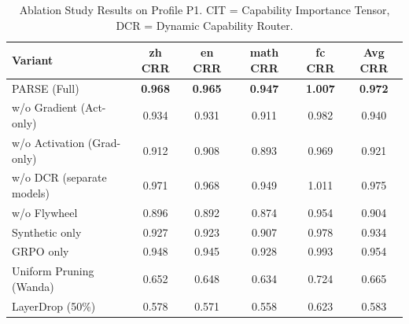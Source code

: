 \begin{table}[t]
\centering
\caption{Ablation Study Results on Profile P1. CIT = Capability Importance Tensor, DCR = Dynamic Capability Router.}
\label{tab:ablation}
\begin{tabular}{l|cccc|c}
\toprule
Variant & zh CRR & en CRR & math CRR & fc CRR & Avg CRR \\
\midrule
PARSE (Full) & \textbf{0.968} & \textbf{0.965} & \textbf{0.947} & \textbf{1.007} & \textbf{0.972} \\
w/o Gradient (Act-only) & 0.934 & 0.931 & 0.911 & 0.982 & 0.940 \\
w/o Activation (Grad-only) & 0.912 & 0.908 & 0.893 & 0.969 & 0.921 \\
w/o DCR (separate models) & 0.971 & 0.968 & 0.949 & 1.011 & 0.975 \\
w/o Flywheel & 0.896 & 0.892 & 0.874 & 0.954 & 0.904 \\
  Synthetic only & 0.927 & 0.923 & 0.907 & 0.978 & 0.934 \\
  GRPO only & 0.948 & 0.945 & 0.928 & 0.993 & 0.954 \\
\midrule
Uniform Pruning (Wanda) & 0.652 & 0.648 & 0.634 & 0.724 & 0.665 \\
LayerDrop (50\%) & 0.578 & 0.571 & 0.558 & 0.623 & 0.583 \\
\bottomrule
\end{tabular}
\end{table}